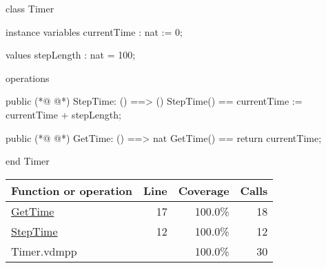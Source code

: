 \begin{vdmpp}[breaklines=true]
class Timer 

instance variables
  currentTime : nat := 0;

values 
  stepLength : nat = 100;

operations

public 
(*@
\label{StepTime:12}
@*)
  StepTime: () ==> ()
  StepTime() == 
    currentTime := currentTime + stepLength;

public
(*@
\label{GetTime:17}
@*)
  GetTime: () ==> nat 
  GetTime() == return currentTime;

end Timer
\end{vdmpp}
\bigskip
\begin{longtable}{|l|r|r|r|}
\hline
Function or operation & Line & Coverage & Calls \\
\hline
\hline
\hyperref[GetTime:17]{GetTime} & 17&100.0\% & 18 \\
\hline
\hyperref[StepTime:12]{StepTime} & 12&100.0\% & 12 \\
\hline
\hline
Timer.vdmpp & & 100.0\% & 30 \\
\hline
\end{longtable}

